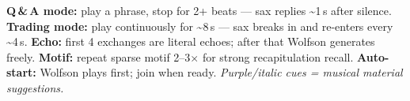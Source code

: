 \documentclass[9pt,a4paper,landscape]{article}
\begin{document}
\vspace{2pt}
{\small
\textbf{Q\,\&\,A mode:} play a phrase, stop for 2+ beats — sax replies \textasciitilde1\,s after silence.\quad
\textbf{Trading mode:} play continuously for \textasciitilde8\,s — sax breaks in and re-enters every \textasciitilde4\,s.\quad
\textbf{Echo:} first 4 exchanges are literal echoes; after that Wolfson generates freely.\quad
\textbf{Motif:} repeat sparse motif 2--3$\times$ for strong recapitulation recall.\quad
\textbf{Auto-start:} Wolfson plays first; join when ready.\quad
\textcolor{musicnote}{\textit{Purple/italic cues = musical material suggestions.}}
}
\end{document}
